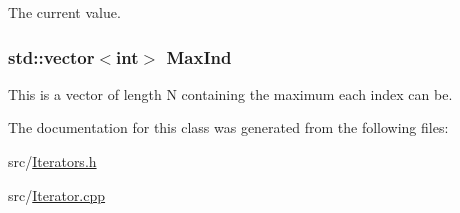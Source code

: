 The current value. \hypertarget{classJKBuilder_1_1Iterator_ab6b56d3c4e9353bc938dd6249cde9ca0}{
\subsubsection[{MaxInd}]{\setlength{\rightskip}{0pt plus 5cm}std::vector$<$int$>$ {\bf MaxInd}}}
\label{classJKBuilder_1_1Iterator_ab6b56d3c4e9353bc938dd6249cde9ca0}


This is a vector of length N containing the maximum each index can be. 

The documentation for this class was generated from the following files:\begin{DoxyCompactItemize}
\item 
src/\hyperlink{Iterators_8h}{Iterators.h}\item 
src/\hyperlink{Iterator_8cpp}{Iterator.cpp}\end{DoxyCompactItemize}
